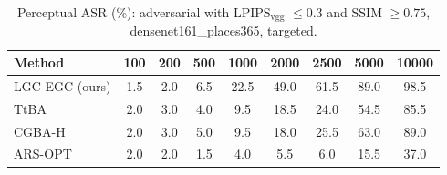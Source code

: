 \begin{table}[t]
\centering\footnotesize
\caption{Perceptual ASR (\%): adversarial with LPIPS$_{\mathrm{vgg}}$ $\le 0.3$ and SSIM $\ge 0.75$, densenet161\_places365, targeted.}
\begin{tabular}{lcccccccc}
\toprule
Method & 100 & 200 & 500 & 1000 & 2000 & 2500 & 5000 & 10000 \\
\midrule
LGC-EGC (ours) & 1.5 & 2.0 & 6.5 & 22.5 & 49.0 & 61.5 & 89.0 & 98.5 \\
TtBA & 2.0 & 3.0 & 4.0 & 9.5 & 18.5 & 24.0 & 54.5 & 85.5 \\
CGBA-H & 2.0 & 3.0 & 5.0 & 9.5 & 18.0 & 25.5 & 63.0 & 89.0 \\
ARS-OPT & 2.0 & 2.0 & 1.5 & 4.0 & 5.5 & 6.0 & 15.5 & 37.0 \\
\bottomrule
\end{tabular}
\end{table}
